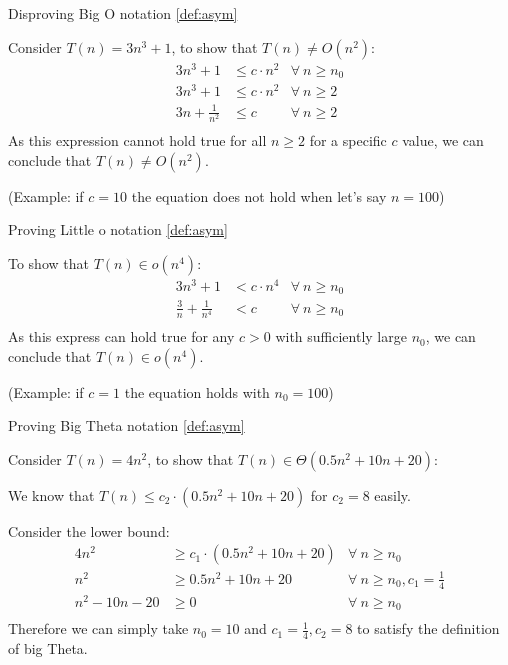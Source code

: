 \begin{example}
    \label{eg:asym_1}
    {Disproving Big O notation} \ref{def:asym}

    Consider $T(n) = 3n^3 + 1$, to show that $T(n) \neq O(n^2)$:
    \begin{align*}
        3n^3 + 1           & \leq c \cdot n^2 & \forall\ n \geq n_0 \\
        3n^3 + 1           & \leq c\cdot n^2  & \forall\ n \geq 2   \\
        3n + \frac{1}{n^2} & \leq c           & \forall\ n \geq 2   \\
    \end{align*}
    As this expression cannot hold true for all $n \geq 2$ for a specific $c$ value, we can conclude that $T(n) \neq O(n^2)$.

    (Example: if $c = 10$ the equation does not hold when let's say $n = 100$)
\end{example}

\begin{example}
    \label{eg:asym_2}
    {Proving Little o notation} \ref{def:asym}

    To show that $T(n) \in o(n^4)$:
    \begin{align*}
        3n^3 + 1                    & < c \cdot n^4 & \forall\ n \geq n_0 \\
        \frac{3}{n} + \frac{1}{n^4} & < c           & \forall\ n \geq n_0 \\
    \end{align*}
    As this express can hold true for any $c > 0$ with sufficiently large $n_0$, we can conclude that $T(n) \in o(n^4)$.

    (Example: if $c = 1$ the equation holds with $n_0 = 100$)
\end{example}

\begin{example}
    \label{eg:asym_3}
    {Proving Big Theta notation} \ref{def:asym}

    Consider $T(n)=4n^2$, to show that $T(n) \in \Theta(0.5n^2+10n+20)$:

    We know that $T(n) \leq c_2 \cdot (0.5n^2 + 10n + 20)$ for $c_2 = 8$ easily.

    Consider the lower bound:
    \begin{align*}
        4n^2          & \geq c_1 \cdot (0.5n^2 + 10n + 20) & \forall\ n \geq n_0                \\
        n^2           & \geq 0.5n^2 + 10n + 20             & \forall\ n \geq n_0, c_1 = \frac14 \\
        n^2 - 10n -20 & \geq 0                             & \forall\ n \geq n_0                \\
    \end{align*}
    Therefore we can simply take $n_0 = 10$ and $c_1 = \frac14, c_2=8$ to satisfy the definition of big Theta.
\end{example}


